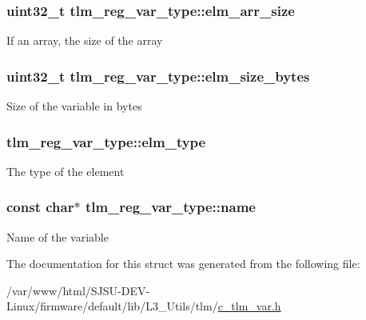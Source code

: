 \subsubsection[{\texorpdfstring{elm\+\_\+arr\+\_\+size}{elm_arr_size}}]{\setlength{\rightskip}{0pt plus 5cm}uint32\+\_\+t tlm\+\_\+reg\+\_\+var\+\_\+type\+::elm\+\_\+arr\+\_\+size}\hypertarget{structtlm__reg__var__type_ad348250db845ef8e6058282413fa3e81}{}\label{structtlm__reg__var__type_ad348250db845ef8e6058282413fa3e81}
If an array, the size of the array 
\subsubsection[{\texorpdfstring{elm\+\_\+size\+\_\+bytes}{elm_size_bytes}}]{\setlength{\rightskip}{0pt plus 5cm}uint32\+\_\+t tlm\+\_\+reg\+\_\+var\+\_\+type\+::elm\+\_\+size\+\_\+bytes}\hypertarget{structtlm__reg__var__type_ac1af23a6695a1c110c6fc753e4101d96}{}\label{structtlm__reg__var__type_ac1af23a6695a1c110c6fc753e4101d96}
Size of the variable in bytes 
\subsubsection[{\texorpdfstring{elm\+\_\+type}{elm_type}}]{ tlm\+\_\+reg\+\_\+var\+\_\+type\+::elm\+\_\+type}\hypertarget{structtlm__reg__var__type_a5f5fc182b60c8600f5b6edaef48ac722}{}\label{structtlm__reg__var__type_a5f5fc182b60c8600f5b6edaef48ac722}
The type of the element 
\subsubsection[{\texorpdfstring{name}{name}}]{\setlength{\rightskip}{0pt plus 5cm}const char$\ast$ tlm\+\_\+reg\+\_\+var\+\_\+type\+::name}\hypertarget{structtlm__reg__var__type_a600d4d4c946ead86a0581cb71c676f4b}{}\label{structtlm__reg__var__type_a600d4d4c946ead86a0581cb71c676f4b}
Name of the variable 

The documentation for this struct was generated from the following file\+:\begin{DoxyCompactItemize}
\item 
/var/www/html/\+S\+J\+S\+U-\/\+D\+E\+V-\/\+Linux/firmware/default/lib/\+L3\+\_\+\+Utils/tlm/\hyperlink{c__tlm__var_8h}{c\+\_\+tlm\+\_\+var.\+h}\end{DoxyCompactItemize}
